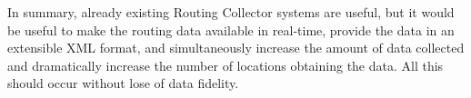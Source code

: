 In summary, already existing Routing Collector systems are useful, but it would be useful to make the routing data available in real-time,  provide the data in an extensible XML format, and simultaneously increase the amount of data collected and dramatically increase the number of locations obtaining the data. All this should occur without lose of data fidelity.











